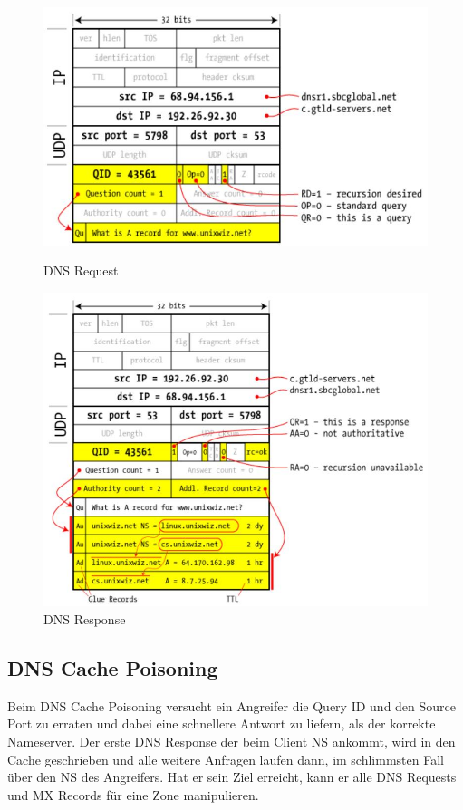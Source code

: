 \begin{figure}[ht!]
	\centering
	\begin{minipage}[t]{0.5\textwidth}
		\centering
		\includegraphics[width=\linewidth]{images/dns_request}
		\caption{DNS Request}
		\label{fig:dnsrequest}
	\end{minipage}
	\begin{minipage}[t]{0.5\textwidth}
		\centering
		\includegraphics[width=\linewidth]{images/dns_response}
		\caption{DNS Response}
		\label{fig:dnsresponse}
	\end{minipage}
\end{figure}

\subsection{DNS Cache Poisoning}
Beim DNS Cache Poisoning versucht ein Angreifer die Query ID und den Source Port zu erraten und dabei eine schnellere Antwort zu liefern, als der korrekte Nameserver. Der erste DNS Response der beim Client NS ankommt, wird in den Cache geschrieben und alle weitere Anfragen laufen dann, im schlimmsten Fall über den NS des Angreifers. Hat er sein Ziel erreicht, kann er alle DNS Requests und MX Records für eine Zone manipulieren.

